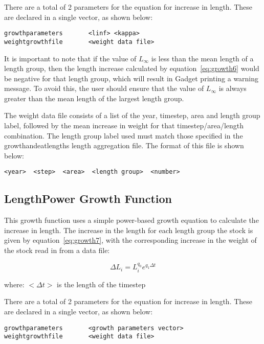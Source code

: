 \documentclass[10pt,twoside]{book}
\begin{document}
\bigskip
There are a total of 2 parameters for the equation for increase in length.  These are declared in a single vector, as shown below:

{\small\begin{verbatim}
growthparameters       <linf> <kappa>
weightgrowthfile       <weight data file>
\end{verbatim}}

It is important to note that if the value of $L_{\infty}$ is less than the mean length of a length group, then the length increase calculated by equation~\ref{eq:growth6} would be negative for that length group, which will result in Gadget printing a warning message.  To avoid this, the user should ensure that the value of $L_{\infty}$ is always greater than the mean length of the largest length group.

\bigskip
The weight data file consists of a list of the year, timestep, area  and length group label, followed by the mean increase in weight for that timestep/area/length combination.  The length group label used must match those specified in the growthandeatlengths length aggregation file.  The format of this file is shown below:

{\small\begin{verbatim}
<year>  <step>  <area>  <length group>  <number>
\end{verbatim}}

\subsection{LengthPower Growth Function}\label{subsec:growth7}
This growth function uses a simple power-based growth equation to calculate the increase in length.  The increase in the length for each length group the stock is given by equation~\ref{eq:growth7}, with the corresponding increase in the weight of the stock read in from a data file:

\begin{equation}\label{eq:growth7}
\Delta L_{i} = L_{i}^{q_{0}} e^{q_{1} \Delta t}
\end{equation}

where:\newline
$<\Delta t>$ is the length of the timestep

\bigskip
There are a total of 2 parameters for the equation for increase in length.  These are declared in a single vector, as shown below:

{\small\begin{verbatim}
growthparameters       <growth parameters vector>
weightgrowthfile       <weight data file>
\end{verbatim}}
\end{document}

